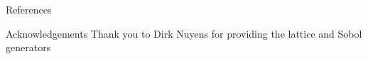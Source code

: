 \documentclass[final]{beamer}
\newlength{\onecolwid}
\begin{document}
\begin{frame}[t]
\begin{columns}[t]
\begin{column}{\onecolwid}
\begin{block}{References}
\nocite{*} %
\small{  %
}

\end{block}

\begin{block}{Acknowledgements}
    Thank you to Dirk Nuyens for providing the lattice and Sobol generators 
\end{block}
\end{column}
\end{columns}
\end{frame}
\end{document}
